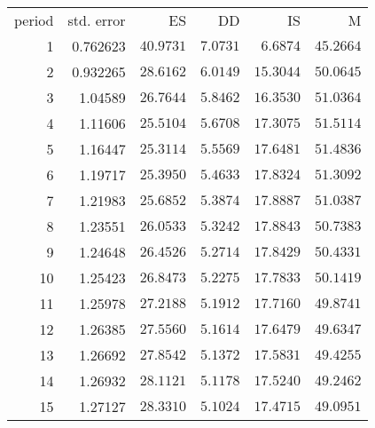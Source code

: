 \documentclass[11pt]{article}
\begin{document}
\begin{longtable}{rrrrrr}
period &  std. error &  ES &  DD &  IS &  M \\
1 & 0.762623 & $40.9731$ & $7.0731$ & $6.6874$ & $45.2664$\\
2 & 0.932265 & $28.6162$ & $6.0149$ & $15.3044$ & $50.0645$\\
3 & 1.04589 & $26.7644$ & $5.8462$ & $16.3530$ & $51.0364$\\
4 & 1.11606 & $25.5104$ & $5.6708$ & $17.3075$ & $51.5114$\\
5 & 1.16447 & $25.3114$ & $5.5569$ & $17.6481$ & $51.4836$\\
6 & 1.19717 & $25.3950$ & $5.4633$ & $17.8324$ & $51.3092$\\
7 & 1.21983 & $25.6852$ & $5.3874$ & $17.8887$ & $51.0387$\\
8 & 1.23551 & $26.0533$ & $5.3242$ & $17.8843$ & $50.7383$\\
9 & 1.24648 & $26.4526$ & $5.2714$ & $17.8429$ & $50.4331$\\
10 & 1.25423 & $26.8473$ & $5.2275$ & $17.7833$ & $50.1419$\\
11 & 1.25978 & $27.2188$ & $5.1912$ & $17.7160$ & $49.8741$\\
12 & 1.26385 & $27.5560$ & $5.1614$ & $17.6479$ & $49.6347$\\
13 & 1.26692 & $27.8542$ & $5.1372$ & $17.5831$ & $49.4255$\\
14 & 1.26932 & $28.1121$ & $5.1178$ & $17.5240$ & $49.2462$\\
15 & 1.27127 & $28.3310$ & $5.1024$ & $17.4715$ & $49.0951$\\
\end{longtable}
\end{document}
